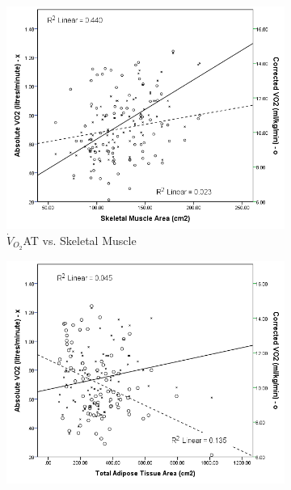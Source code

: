 \begin{figure}[htb]
	\centering
	\begin{subfigure}[b]{0.45\textwidth}
		\centering
		\includegraphics[width=\textwidth]{Figures/bc_scatter_VO2_skeletal}
		\caption{$\dot{V}_{O_2}$AT vs. 
Skeletal Muscle}
		\label{fig:bc_scatter_VO2_skeletal}
	\end{subfigure}
	\hfill
	\begin{subfigure}[b]{0.45\textwidth}
		\centering
		\includegraphics[width=\textwidth]{Figures/bc_scatter_VO2_TAT}

\end{subfigure}
\end{figure}
